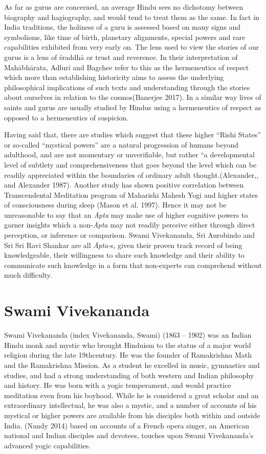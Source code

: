 As far as gurus are concerned, an average Hindu sees no dichotomy between biography and hagiography, and would tend to treat them as the same. In fact in India traditions, the holiness of a guru is assessed based on many signs and symbolisms, like time of birth, planetary alignments, special powers and rare capabilities exhibited from very early on. The lens used to view the stories of our gurus is a lens of śraddhā or trust and reverence. In their interpretation of Mahābhārata, Adluri and Bagchee refer to this as the hermeneutics of respect which more than establishing historicity aims to assess the underlying philosophical implications of such texts and understanding through the stories about ourselves in relation to the cosmos(Banerjee 2017). In a similar way lives of saints and gurus are usually studied by Hindus using a hermeneutics of respect as opposed to a hermeneutics of suspicion.

Having said that, there are studies which suggest that these higher “Rishi States” or so-called “mystical powers” are a natural progression of humans beyond adulthood, and are not momentary or unverifiable, but rather “a developmental level of subtlety and comprehensiveness that goes beyond the level which can be readily appreciated within the boundaries of ordinary adult thought.(Alexander,, and Alexander 1987). Another study has shown positive correlation between Transcendental Meditation program of Maharishi Mahesh Yogi and higher states of consciousness during sleep (Mason et al. 1997). Hence it may not be unreasonable to say that an \textit{Āpta} may make use of higher cognitive powers to garner insights which a non-\textit{Āpta} may not readily perceive either through direct perception, or inference or comparison. Swami Vivekananda, Sri Aurobindo and Sri Sri Ravi Shankar are all \textit{Āpta-}s, given their proven track record of being knowledgeable, their willingness to share such knowledge and their ability to communicate such knowledge in a form that non-experts can comprehend without much difficulty.


\section*{Swami Vivekananda}

Swami Vivekananda (index Vivekananda, Swami) (1863 – 1902) was an Indian Hindu monk and mystic who brought Hinduism to the status of a major world religion during the late 19thcentury. He was the founder of Ramakrishna Math and the Ramakrishna Mission. As a student he excelled in music, gymnastics and studies, and had a strong understanding of both western and Indian philosophy and history. He was born with a yogic temperament, and would practice meditation even from his boyhood. While he is considered a great scholar and an extraordinary intellectual, he was also a mystic, and a number of accounts of his mystical or higher powers are available from his disciples both within and outside India. (Nandy 2014) based on accounts of a French opera singer, an American national and Indian disciples and devotees, touches upon Swami Vivekananda’s advanced yogic capabilities.

